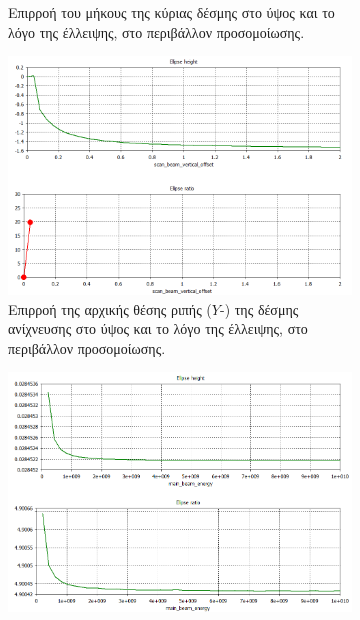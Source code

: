 \begin{figure}[tph]
\begin{subfigure}{0.47\textwidth}
		\centering
		\caption{Επιρροή του μήκους της κύριας δέσμης στο ύψος και το λόγο της έλλειψης, στο περιβάλλον προσομοίωσης.}
		\label{fig:CST-ellipse-height-ratio-by-bunch-length}
	\end{subfigure}
	\par\bigskip
	\begin{subfigure}{0.47\textwidth}
		\includegraphics[width=\linewidth]{figures/CST-variable-analysis/combined/CST-ellipse-height-ratio-by-vertical-offset}
		\centering
		\caption{Επιρροή της αρχικής θέσης ριπής ($Y$-) της δέσμης ανίχνευσης στο ύψος και το λόγο της έλλειψης, στο περιβάλλον προσομοίωσης.}
		\label{fig:CST-ellipse-height-ratio-by-vertical-offset}
	\end{subfigure}
	\hfill
	\begin{subfigure}{0.47\textwidth}
		\includegraphics[width=\linewidth]{figures/CST-variable-analysis/combined/CST-ellipse-height-ratio-by-voltage}

\end{subfigure}
\end{figure}
